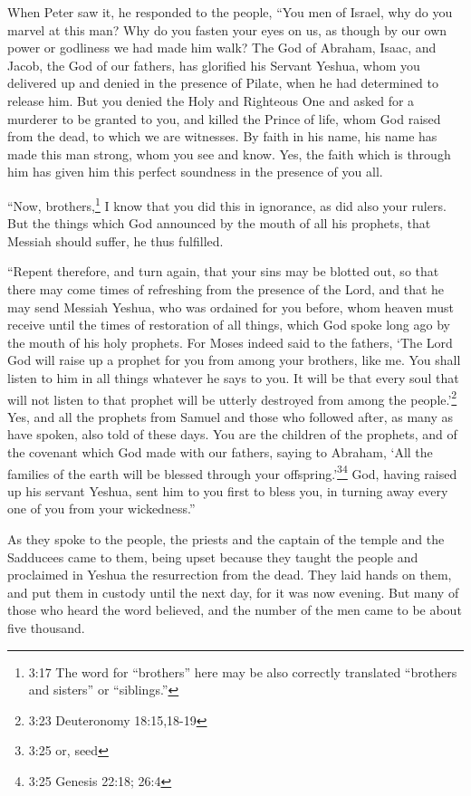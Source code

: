 \myverse{}When Peter saw it, he responded to the people, “You men of Israel,
why do you marvel at this man? Why do you fasten your eyes on us, as though by our own power or godliness
we had made him walk?
\myverse{}The God of Abraham, Isaac, and Jacob, the God of our fathers, has glorified
his Servant Yeshua, whom you delivered up and denied in the presence of Pilate, when he had determined
to release him.
\myverse{}But you denied the Holy and Righteous One and asked for a murderer to be granted
to you,
\myverse{}and killed the Prince of life, whom God raised from the dead, to which we
are witnesses.
\myverse{}By faith in his name, his name has made this man strong, whom you see and
know. Yes, the faith which is through him has given him this perfect soundness in the presence of you
all.

\myverse{}“Now, brothers,\footnote{3:17 The word for “brothers” here may be also correctly translated “brothers and sisters” or “siblings.”}
I know that you did this in ignorance, as did also your rulers.
\myverse{}But the things which God announced by the mouth of all his prophets, that
Messiah should suffer, he thus fulfilled.

\myverse{}“Repent therefore, and turn again, that your sins may be blotted
out, so that there may come times of refreshing from the presence of the Lord,
\myverse{}and that he may send Messiah Yeshua, who was ordained for you before,
\myverse{}whom heaven must receive until the times of restoration of all things, which
God spoke long ago by the mouth of his holy prophets.
\myverse{}For Moses indeed said to the fathers, ‘The Lord God will raise up a prophet
for you from among your brothers, like me. You shall listen to him in all things whatever he says to you.
\myverse{}It will be that every soul that will not listen to that prophet will be utterly
destroyed from among the people.’\footnote{3:23 Deuteronomy 18:15,18-19
}
\myverse{}Yes, and all the prophets from Samuel and those who followed after, as many
as have spoken, also told of these days.
\myverse{}You are the children of the prophets, and of the covenant which God made with
our fathers, saying to Abraham, ‘All the families of the earth will be blessed through your offspring.’\footnote{3:25 or, seed}\footnote{3:25 Genesis 22:18;
	26:4}
\myverse{}God, having raised up his servant Yeshua, sent him to you first to bless you,
in turning away every one of you from your wickedness.”


\mychapter{} \myverse*{}As they spoke to the people, the priests and the captain of the
temple and the Sadducees came to them,
\myverse{}being upset because they taught the people and proclaimed in Yeshua the resurrection
from the dead.
\myverse{}They laid hands on them, and put them in custody until the next day, for it
was now evening.
\myverse{}But many of those who heard the word believed, and the number of the men came
to be about five thousand.

